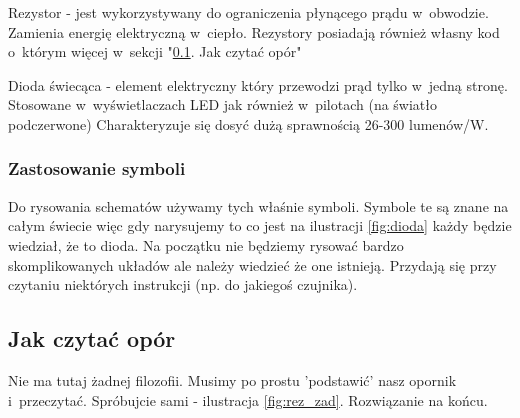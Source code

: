 \documentclass[a4paper,12pt, twoside]{article}
\begin{document}
Rezystor - jest wykorzystywany do ograniczenia płynącego prądu w~obwodzie. Zamienia energię elektryczną w~ciepło. Rezystory posiadają również własny kod o~którym więcej w~sekcji "\ref{subsec:kod}. Jak czytać opór" %

Dioda świecąca - element elektryczny który przewodzi prąd tylko w~jedną stronę. Stosowane w~wyświetlaczach LED jak również w~pilotach (na światło podczerwone) Charakteryzuje się dosyć dużą sprawnością 26-300 lumenów/W. 

\subsubsection{Zastosowanie symboli}
    
Do rysowania schematów używamy tych właśnie symboli. Symbole te są znane na całym świecie więc gdy narysujemy to co jest na ilustracji \ref{fig:dioda} każdy będzie wiedział, że to dioda. Na początku nie będziemy rysować bardzo skomplikowanych układów ale należy wiedzieć że one istnieją. Przydają się przy czytaniu niektórych instrukcji (np. do jakiegoś czujnika).

	\subsection{Jak czytać opór}
	\label{subsec:kod}
Nie ma tutaj żadnej filozofii. Musimy po prostu 'podstawić' nasz opornik i~przeczytać. Spróbujcie sami - ilustracja \ref{fig:rez_zad}. Rozwiązanie na końcu.
\end{document}
